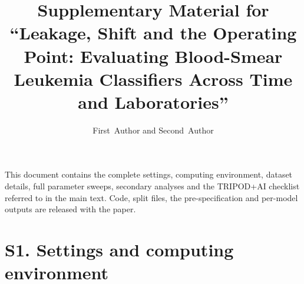 \documentclass[journal,onecolumn]{IEEEtran}
\let\origtable\table\let\endorigtable\endtable
\renewenvironment{table}[1][]{\origtable[H]}{\endorigtable}
\begin{document}
\title{Supplementary Material for ``Leakage, Shift and the Operating Point: Evaluating Blood-Smear Leukemia Classifiers Across Time and Laboratories''}
\author{First~Author and Second~Author}
\maketitle
\noindent This document contains the complete settings, computing environment, dataset details, full parameter sweeps, secondary analyses and the TRIPOD+AI checklist referred to in the main text. Code, split files, the pre-specification and per-model outputs are released with the paper.

\section*{S1. Settings and computing environment}

\begin{table}[!htbp]
\centering
\caption{Computing environment and run times.}
\label{tab:env}
\end{table}
\end{document}
